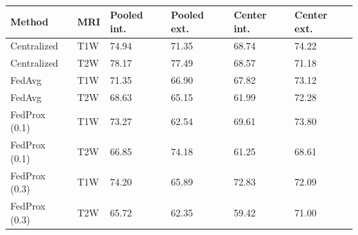 \begin{table}[ht]
\centering
\caption{}
\label{tab:zw-matched-auc}
{\color{ZhixiangPink}\small
\begin{tabular}{llllll}
\toprule
Method & MRI & Pooled int. & Pooled ext. & Center int. & Center ext.\\
\midrule
Centralized & T1W & 74.94 & 71.35 & 68.74 & 74.22\\
Centralized & T2W & 78.17 & 77.49 & 68.57 & 71.18\\
FedAvg & T1W & 71.35 & 66.90 & 67.82 & 73.12\\
FedAvg & T2W & 68.63 & 65.15 & 61.99 & 72.28\\
FedProx (0.1) & T1W & 73.27 & 62.54 & 69.61 & 73.80\\
FedProx (0.1) & T2W & 66.85 & 74.18 & 61.25 & 68.61\\
FedProx (0.3) & T1W & 74.20 & 65.89 & 72.83 & 72.09\\
FedProx (0.3) & T2W & 65.72 & 62.35 & 59.42 & 71.00\\
\bottomrule
\end{tabular}}
\end{table}
